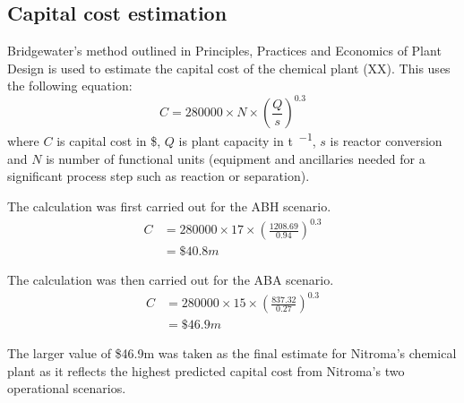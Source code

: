 \subsection{Capital cost estimation}
Bridgewater's method outlined in Principles, Practices and Economics of Plant Design is used to estimate the capital cost of the chemical plant (XX). This uses the following equation:
\begin{equation}
    C= \num{280000} \times N \times \left(\frac{Q}{s}\right)^{0.3}
\end{equation}
where $C$ is capital cost in \$, $Q$ is  plant capacity in \si{\tonne\per\year}, $s$ is reactor conversion and $N$ is number of functional units (equipment and ancillaries needed for a significant process step such as reaction or separation).

The calculation was first carried out for the ABH scenario.
\begin{align*}
C &= 280000 \times 17 \times \left(\frac{1208.69}{0.94}\right)^{0.3}  \\
  &=\$40.8m 
\end{align*}

The calculation was then carried out for the ABA scenario.
\begin{align*}
C &= \num{280000} \times 15 \times \left(\frac{837.32}{0.27}\right)^{0.3}  \\
  &= \$46.9m 
\end{align*}

The larger value of \$46.9m was taken as the final estimate for Nitroma's chemical plant as it reflects the highest predicted capital cost from Nitroma's two operational scenarios.